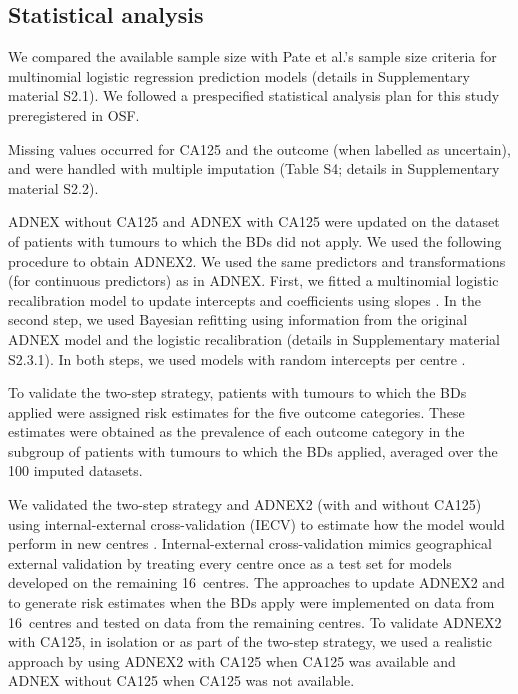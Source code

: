 \subsection{Statistical analysis}

We compared the available sample size with Pate et al.'s sample size criteria for multinomial logistic regression prediction models \cite{pateMinimumSampleSize2023} (details in Supplementary material S2.1). We followed a prespecified statistical analysis plan for this study preregistered in \gls{OSF}.

Missing values occurred for \gls{CA125} and the outcome (when labelled as uncertain), and were handled with multiple imputation (Table S4; details in Supplementary material S2.2). 

ADNEX without \gls{CA125} and ADNEX with \gls{CA125} were updated on the dataset of patients with tumours to which the \glspl{BD} did not apply. We used the following procedure to obtain ADNEX2. We used the same predictors and transformations (for continuous predictors) as in \gls{ADNEX}. First, we fitted a multinomial logistic recalibration model to update intercepts and coefficients using slopes \cite{vancalsterValidationUpdatingRisk2017}. In the second step, we used Bayesian refitting using information from the original \gls{ADNEX} model and the logistic recalibration \cite{suReviewStatisticalUpdating2018,vandeschootBayesianStatisticsModelling2021} (details in Supplementary material S2.3.1). In both steps, we used models with random intercepts per centre \cite{wynantsDoesIgnoringClustering2018}.

To validate the two-step strategy, patients with tumours to which the \glspl{BD} applied were assigned risk estimates for the five outcome categories. These estimates were obtained as the prevalence of each outcome category in the subgroup of patients with tumours to which the \glspl{BD} applied, averaged over the 100 imputed datasets.

We validated the two-step strategy and ADNEX2 (with and without \gls{CA125}) using internal-external cross-validation (IECV) to estimate how the model would perform in new centres \cite{collinsEvaluationClinicalPrediction2024, roystonConstructionValidationPrognostic2004}. Internal-external cross-validation mimics geographical external validation by treating every centre once as a test set for models developed on the remaining 16~centres. The approaches to update ADNEX2 and to generate risk estimates when the \glspl{BD} apply were implemented on data from 16~centres and tested on data from the remaining centres. To validate ADNEX2 with \gls{CA125}, in isolation or as part of the two-step strategy, we used a realistic approach by using ADNEX2 with \gls{CA125} when \gls{CA125} was available and ADNEX without \gls{CA125} when \gls{CA125} was not available.

